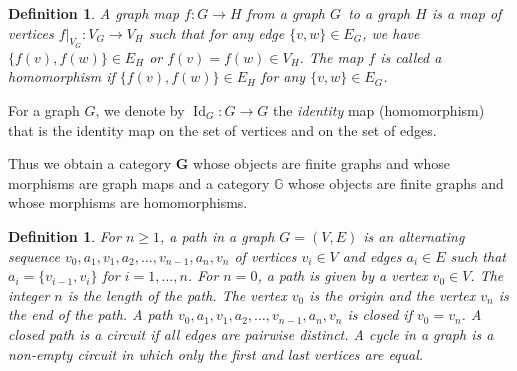 \documentclass[a4paper, 11pt]{article}
\newtheorem{definition}[theorem]{Definition}
\begin{document}
\begin{definition} \label{d2.3}\rm A \emph{graph map $f\colon G\to H$}  from a graph
$G$\emph{\ }to a graph $H$ is a map of vertices $f|_{V_G}\colon
V_{G}\rightarrow V_{H}$ such that for any edge   $\{v,w\}\in E_G$,  we have   
$\{f(v),f(w)\}\in E_H$  or $f(v) =f(w)\in V_H$. The map
$f$ is called a \emph{homomorphism}  if $\{f(v),f(w)\}
\in E_H$ for any $\{v,w\}\in E_G$. 
\end{definition}

For a graph $G$,  we  denote by $\operatorname{Id}_G\colon G\to G$ the \emph{identity} map (homomorphism)  that is the identity map on the set of vertices and  on the set  of edges. 

Thus we obtain a category  $\mathbf G$ whose objects  are  finite graphs
and whose morphisms are graph maps  and   a category  $\mathbb G$  whose objects  are  finite graphs
and whose morphisms are homomorphisms. 




\begin{definition}\label{d2.4}  \rm For $n\geq 1$,  a \emph{path} in a graph $G=(V,E)$ is an alternating sequence $v_0, a_1, v_1, a_2, \dots , v_{n-1}, a_n, v_n$ of vertices 
$v_i\in V$ and edges $a_i\in E$ such that $a_i=\{v_{i-1}, v_i\}$ for $i=1, \dots, n$.  
For $n=0$,  a path is given by a vertex $v_0\in V$. The integer $n$ is the \emph{length} of the path.  The vertex $v_0$ is  the \emph{origin}  and the vertex $v_n$ is the \emph{end} of the path. A path $v_0, a_1, v_1, a_2, \dots , v_{n-1}, a_n, v_n$ is   \emph{closed} if $v_0=v_n$. A closed path  is  a  \emph{circuit } if all edges are pairwise distinct.   A \emph{cycle} in a graph is a non-empty circuit in which only the first and last vertices are equal.
\end{definition} 
\end{document}
